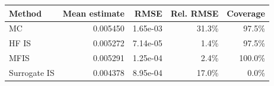 \begin{tabular}{lrrrr}
\toprule
Method & Mean estimate & RMSE & Rel. RMSE & Coverage \\
\midrule
MC & 0.005450 & 1.65e-03 & 31.3\% & 97.5\% \\
HF IS & 0.005272 & 7.14e-05 & 1.4\% & 97.5\% \\
MFIS & 0.005291 & 1.25e-04 & 2.4\% & 100.0\% \\
Surrogate IS & 0.004378 & 8.95e-04 & 17.0\% & 0.0\% \\
\bottomrule
\end{tabular}